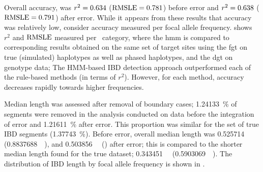 %

%

Overall accuracy,  was
${r^2=\dec{0.6340087}}$ (${\rmsle=\dec{0.7812424}}$) before error and
${r^2=\dec{0.6381827}}$ (${\rmsle=\dec{0.7911286}}$) after error.
While it appears from these results that accuracy was relatively low, consider accuracy measured per focal allele frequency.
 shows $r^2$ and $\operatorname*{RMSLE}$ measured per \fk{}~category, where the \gls{hmm} is compared to corresponding results obtained on the same set of target sites using the \gls{fgt} on true (simulated) haplotypes as well as phased haplotypes, and the \gls{dgt} on genotype data; 
The HMM-based IBD detection approach outperformed each of the rule-based methods (in terms of $r^2$).
However, for each method, accuracy decreases rapidly towards higher frequencies.

%

%

Median length was assessed after removal of boundary cases;
\SI{1.24133}{\percent} of segments were removed in the analysis conducted on data before the integration of error and \SI{1.21611}{\percent} after error.
This proportion was similar for the set of true IBD segments (\SI{1.37743}{\percent}).
Before error, overall median length was
\SI{0.525714}{\mega\basepair} (\SI{0.8837688}{\centi\morgan}), and
\SI{0.503856}{\mega\basepair} () after error; this is compared to the shorter median length found for the true dataset;
\SI{0.343451}{\mega\basepair} (\SI{0.5903069}{\centi\morgan}).
The distribution of IBD length by focal allele frequency is shown in .


